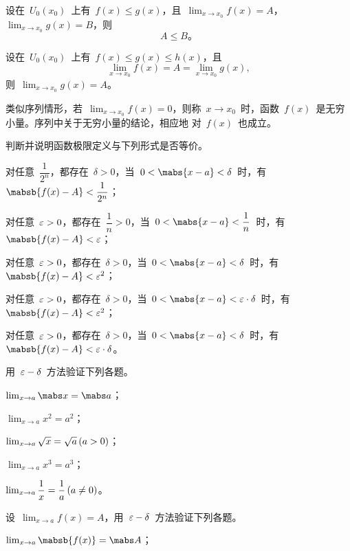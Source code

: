 \begin{theorem}\label{thm:sec2.4-4}
设在~$U_0(x_0)$~上有~$f(x)\leq g(x)$，且~$\lim_{x\to x_0}f(x)=A$，$\lim_{x\to x_0}g(x)=B$，则
\[
  A\leq B。
\]
\end{theorem}

\begin{theorem}\label{thm:sec2.4-5}
设在~$U_0(x_0)$~上有~$f(x)\leq g(x)\leq h(x)$，且
\[
  \lim_{x\to x_0}f(x)=A=\lim_{x\to x_0}g(x),
\]
则~$\lim_{x\to x_0}g(x)=A$。
\end{theorem}

类似序列情形，若~$\lim_{x\to x_0}f(x)=0$，则称~$x\to x_0$~时，函数~$f(x)$~是无穷小量。序列中关于无穷小量的结论，相应地
对~$f(x)$~也成立。

\begin{exercise}
\item 判断并说明函数极限定义与下列形式是否等价。
\begin{exlist}
  \item 对任意~$\dfrac1{2^n}$，都存在~$\delta>0$，当~$0<\mabs{x-a}<\delta$~时，有~$\mabsb{f(x)-A}<\dfrac1{2^n}$；
  \item 对任意~$\varepsilon>0$，都存在~$\dfrac1n>0$，当~$0<\mabs{x-a}<\dfrac1n$~时，有~$\mabsb{f(x)-A}<\e$；
  \item 对任意~$\varepsilon>0$，都存在~$\delta>0$，当~$0<\mabs{x-a}<\delta$~时，有~$\mabsb{f(x)-A}<\e^2$；
  \item 对任意~$\varepsilon>0$，都存在~$\delta>0$，当~$0<\mabs{x-a}<\e\cdot\delta$~时，有~$\mabsb{f(x)-A}<\e^2$；
  \item 对任意~$\varepsilon>0$，都存在~$\delta>0$，当~$0<\mabs{x-a}<\delta$~时，有~$\mabsb{f(x)-A}<\e\cdot\delta$。
\end{exlist}
\item 用~$\varepsilon-\delta$~方法验证下列各题。
\begin{exlistcols}[3]
  \item $\lim_{x\to a}\mabs x=\mabs a$；
  \item $\lim_{x\to a}x^2=a^2$；
  \item $\lim_{x\to a}\sqrt x=\sqrt a\mcond{a>0}$；
  \item $\lim_{x\to a}x^3=a^3$；
  \item $\lim_{x\to a}\dfrac1x=\dfrac1a\mcond{a\neq0}$。
\end{exlistcols}
\item 设~$\lim_{x\to a}f(x)=A$，用~$\varepsilon-\delta$~方法验证下列各题。
\begin{exlistcols}
  \item $\lim_{x\to a}\mabsb{f(x)}=\mabs A$；

\end{exlistcols}
\end{exercise}
